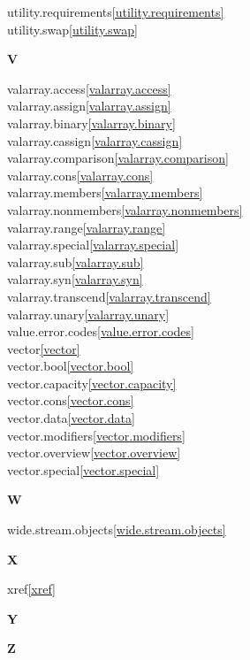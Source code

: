 \begin{multicols}{2}
utility.requirements\quad\ref{utility.requirements}\\
utility.swap\quad\ref{utility.swap}\\
\par \textbf{V}\par
valarray.access\quad\ref{valarray.access}\\
valarray.assign\quad\ref{valarray.assign}\\
valarray.binary\quad\ref{valarray.binary}\\
valarray.cassign\quad\ref{valarray.cassign}\\
valarray.comparison\quad\ref{valarray.comparison}\\
valarray.cons\quad\ref{valarray.cons}\\
valarray.members\quad\ref{valarray.members}\\
valarray.nonmembers\quad\ref{valarray.nonmembers}\\
valarray.range\quad\ref{valarray.range}\\
valarray.special\quad\ref{valarray.special}\\
valarray.sub\quad\ref{valarray.sub}\\
valarray.syn\quad\ref{valarray.syn}\\
valarray.transcend\quad\ref{valarray.transcend}\\
valarray.unary\quad\ref{valarray.unary}\\
value.error.codes\quad\ref{value.error.codes}\\
vector\quad\ref{vector}\\
vector.bool\quad\ref{vector.bool}\\
vector.capacity\quad\ref{vector.capacity}\\
vector.cons\quad\ref{vector.cons}\\
vector.data\quad\ref{vector.data}\\
vector.modifiers\quad\ref{vector.modifiers}\\
vector.overview\quad\ref{vector.overview}\\
vector.special\quad\ref{vector.special}\\
\par \textbf{W}\par
wide.stream.objects\quad\ref{wide.stream.objects}\\
\par \textbf{X}\par
xref\quad\ref{xref}\\
\par \textbf{Y}\par
\par \textbf{Z}\par
\end{multicols}

